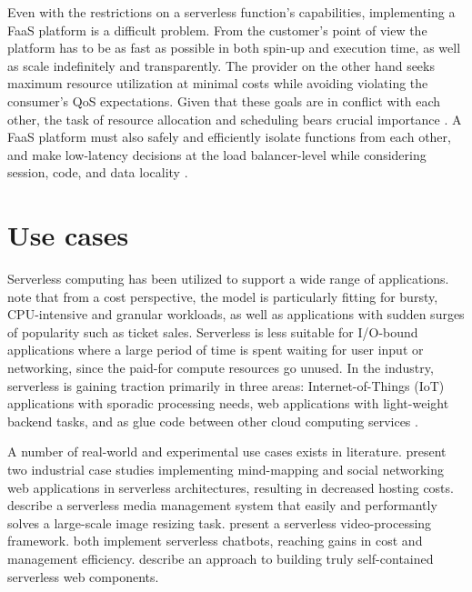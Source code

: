 Even with the restrictions on a serverless function's capabilities, implementing a FaaS platform is a difficult problem. From the customer's point of view the platform has to be as fast as possible in both spin-up and execution time, as well as scale indefinitely and transparently. The provider on the other hand seeks maximum resource utilization at minimal costs while avoiding violating the consumer's QoS expectations. Given that these goals are in conflict with each other, the task of resource allocation and scheduling bears crucial importance \parencite{reza17controller}. A FaaS platform must also safely and efficiently isolate functions from each other, and make low-latency decisions at the load balancer-level while considering session, code, and data locality \parencite{hendrickson16openlambda}.


\section{Use cases} \label{sec:useCases}

Serverless computing has been utilized to support a wide range of applications. \textcite{baldini17currentTrends} note that from a cost perspective, the model is particularly fitting for bursty, CPU-intensive and granular workloads, as well as applications with sudden surges of popularity such as ticket sales. Serverless is less suitable for I/O-bound applications where a large period of time is spent waiting for user input or networking, since the paid-for compute resources go unused. In the industry, serverless is gaining traction primarily in three areas: Internet-of-Things (IoT) applications with sporadic processing needs, web applications with light-weight backend tasks, and as glue code between other cloud computing services \parencite{spillner18faaster}.

A number of real-world and experimental use cases exists in literature. \textcite{adzic2017serverless} present two industrial case studies implementing mind-mapping and social networking web applications in serverless architectures, resulting in decreased hosting costs. \textcite{mcgrath16cloudEventParadigms} describe a serverless media management system that easily and performantly solves a large-scale image resizing task. \textcite{fouladi2017encoding} present a serverless video-processing framework. \textcite{yan16chatbot,lehva18chatbot} both implement serverless chatbots, reaching gains in cost and management efficiency. \textcite{ast17webcomponent} describe an approach to building truly self-contained serverless web components.

